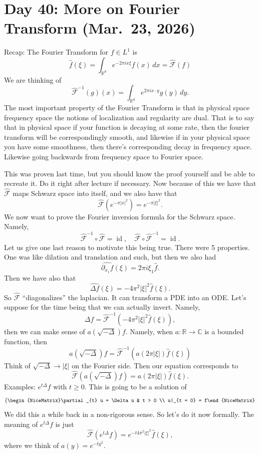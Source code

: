 \section{Day 40: More on Fourier Transform (Mar.\ 23, 2026)}
Recap: The Fourier Transform for \( f \in L^{1} \) is
\[ \hat f( \xi) = \int_{\mathbb{R}^{d}} e^{-2 \pi i x \xi} f(x) \, dx = \hat {\mathcal{F}}(f) \]
We are thinking of
\[ \hat {\mathcal{F}}^{-1}(g)(x) = \int_{\mathbb{R}^{d}} e^{2 \pi i x \cdot y} g(y) \, dy.  \]
The most important property of the Fourier Transform is that in physical space frequency space the notions of localization and regularity are dual. That is to say that in physical space if your function is decaying at some rate, then the fourier transform will be correspondingly smooth, and likewise if in your physical space you have some smoothness, then there's corresponding decay in frequency space. Likewise going backwards from frequency space to Fourier space.

This was proven last time, but you should know the proof yourself and be able to recreate it. Do it right after lecture if necessary. Now because of this we have that \( \hat {\mathcal{F}} \) maps Schwarz space into itself, and we also have that
\[ \hat {\mathcal{F}} \left( e^{- \pi |x|^{2}} \right) = e^{- \pi | \xi|^{2}}. \]
We now want to prove the Fourier inversion formula for the Schwarz space. Namely,
\[ \hat {\mathcal{F}}^{-1} \circ \hat {\mathcal{F}} = \operatorname{id}, \quad \hat {\mathcal{F}} \circ \hat {\mathcal{F}}^{-1} = \operatorname{id}.  \]
Let us give one last reason to motivate this being true. There were 5 properties. One was like dilation and translation and such, but then we also had
\[ \widehat{\partial_{x_{1}} f}( \xi) = 2 \pi i \xi_{1} \hat f. \]
Then we have also that
\[ \widehat{\Delta f}(\xi) = - 4 \pi^{2} | \xi|^{2} \hat f(\xi). \]
So \( \hat {\mathcal{F}} \) ``diagonalizes'' the laplacian. It can transform a PDE into an ODE\@. Let's suppose for the time being that we can actually invert. Namely,
\[ \Delta f = \hat {\mathcal{F}}^{-1} \left( -4 \pi^{2} | \xi|^{2} \hat f(\xi) \right), \]
then we can make sense of \(a \left( \sqrt{- \Delta}\right) f\). Namely, when \( a \colon \mathbb{R} \to \mathbb{C} \) is a bounded function, then
\[ a \left( \sqrt{- \Delta} \right) f = \hat {\mathcal{F}}^{-1} \left( a(2 \pi | \xi|) \hat f( \xi) \right) \]
Think of \( \sqrt{- \Delta} \to | \xi| \) on the Fourier side. Then our equation corresponds to
\[ \hat {\mathcal{F}} \left( a( \sqrt{- \Delta}) f \right) = a(2 \pi | \xi|) \hat f ( \xi). \]
Examples: \( e^{t \Delta}f \) with \( t \ge 0 \). This is going to be a solution of
\[ \left\{\begin{NiceMatrix}\partial_{t} u = \Delta u & t > 0 \\ u|_{t = 0} = f\end{NiceMatrix}\right.  \]
We did this a while back in a non-rigorous sense. So let's do it now formally. The meaning of \( e^{t \Delta}f \) is just
\[ \hat {\mathcal{F}} \left( e^{t \Delta} f \right) = e^{- t 4 \pi^{2} | \xi|^{2}} \hat f( \xi), \]
where we think of \( a(y) = e^{-t y^{2}} \).

